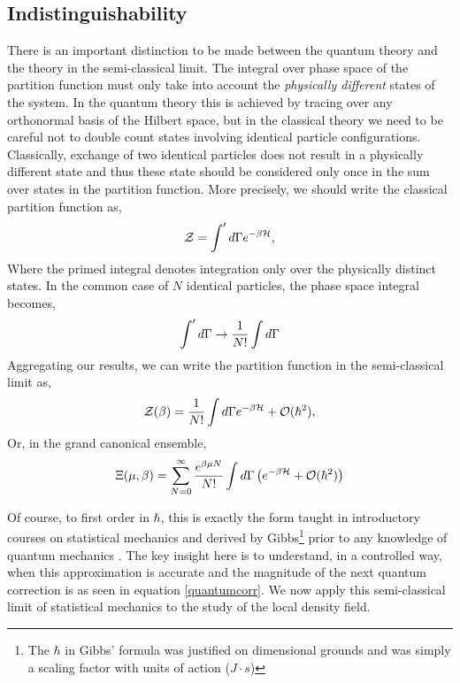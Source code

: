 \subsection{Indistinguishability} %

There is an important distinction to be made between the quantum theory and the
theory in the semi-classical limit.  The integral over phase space of the
partition function must only take into account the \textit{physically
different} states of the system.  In the quantum theory this is achieved by
tracing over any orthonormal basis of the Hilbert space, but in the classical
theory we need to be careful not to double count states involving identical
particle configurations. Classically, exchange of two identical particles does
not result in a physically different state and thus these state should be
considered only once in the sum over states in the partition function.  More
precisely, we should write the classical partition function as,
%
\begin{equation}
    \mathcal{Z} = \int^\prime d\Gamma e^{-\beta \mathcal{H}}, 
\end{equation}
%
Where the primed integral denotes integration only over the physically distinct
states. In the common case of $N$ identical particles, the phase space integral
becomes, 
%
\begin{equation}
    \int^\prime d\Gamma \rightarrow \frac{1}{N!}\int d\Gamma
\end{equation}
%
Aggregating our results, we can write the partition function in the
semi-classical limit as,
%
\begin{equation}
    \mathcal{Z}(\beta) = \frac{1}{N!}\int d\Gamma e^{-\beta \mathcal{H}} + \mathcal{O}(\hbar ^ 2),
\end{equation}
%
Or, in the grand canonical ensemble,
%
\begin{equation} 
    \Xi(\mu, \beta) = \sum_{N = 0}^\infty \frac{e^{\beta\mu N}}{N!}
        \int d\Gamma \left( e^{-\beta \mathcal{H}} + \mathcal{O}(\hbar^2)\right)
\end{equation}

Of course, to first order in $\hbar$, this is exactly the form taught in
introductory courses on statistical mechanics and derived by Gibbs\footnote{The
$\hbar$ in Gibbs' formula was justified on dimensional grounds and was simply a
scaling factor with units of action ($J\cdot s$)} prior to any knowledge of
quantum mechanics \cite{Gibbs}. The key insight here is to understand, in a
controlled way, when this approximation is accurate and the magnitude of the next
quantum correction is as seen in equation \ref{quantumcorr}. We now apply this
semi-classical limit of statistical mechanics to the study of the local density
field.


